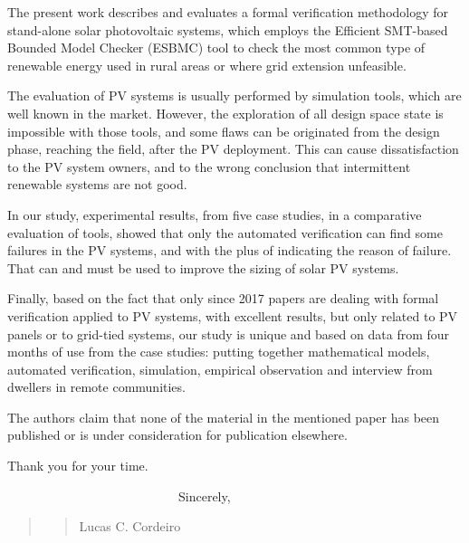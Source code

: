 \documentclass[11pt]{article}
\newcommand\vi{\vspace{\baselineskip}}
\begin{document}
The present work describes and evaluates a formal verification methodology for stand-alone solar photovoltaic systems, which employs the Efficient SMT-based Bounded Model Checker (ESBMC) tool to check the most common type of renewable energy used in rural areas or where grid extension unfeasible.

The evaluation of PV systems is usually performed by simulation tools, which are well known in the market. However, the exploration of all design space state is impossible with those tools, and some flaws can be originated from the design phase, reaching the field, after the PV deployment. This can cause dissatisfaction to the PV system owners, and to the wrong conclusion that intermittent renewable systems are not good.
   
In our study, experimental results, from five case studies, in a comparative evaluation of tools, showed that only the automated verification can find some failures in the PV systems, and with the plus of indicating the reason of failure. That can and must be used to improve the sizing of solar PV systems.

Finally, based on the fact that only since 2017 papers are dealing with formal verification applied to PV systems, with excellent results, but only related to PV panels or to grid-tied systems, our study is unique and based on data from four months of use from the case studies: putting together mathematical models, automated verification, simulation, empirical observation and interview from dwellers in remote communities.

The  authors  claim  that  none  of  the  material  in  the mentioned  paper  has  been  published  or  is  under  consideration for publication elsewhere.

\vi

Thank you for your time.
\vi

\indent
~~~~~~~~~~~~~~~~~~~~~~~~~~~Sincerely,\\

\begin{quote}
\begin{quote}
\begin{flushright}



Lucas C. Cordeiro~~~~~~~
\end{flushright}
\end{quote}
\end{quote}


 
 
\end{document}
